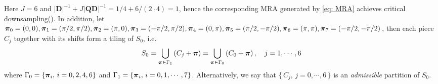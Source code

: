 Here $J= 6$ and $ |\mathbf{D}|^{-1} + J|\mathbf{QD}|^{-1} = 1/4 + 6/ (2\cdot 4) = 1$, hence the corresponding MRA generated by \eqref{eq: MRA} achieves critical downsampling(\cite{durand2007}). 
In addition, let {\small $\boldsymbol{\pi}_0 = (0,0), \boldsymbol{\pi}_1 = (\pi/2,\pi/2), \boldsymbol{\pi}_2 = (\pi,0),\boldsymbol{\pi}_3 = (-\pi/2,\pi/2), \boldsymbol{\pi}_4 = (0,\pi), \boldsymbol{\pi}_5 = (\pi/2,-\pi/2),\boldsymbol{\pi}_6 = (\pi,\pi), \boldsymbol{\pi}_7=(-\pi/2,-\pi/2)$}, then each piece $C_j$ together with its shifts form a tiling of $S_0$, i.e.
\begin{align}\label{eq: tiling}
S_0 = \bigcup_{\boldsymbol{\pi}\in\Gamma_1}\left(C_j + \boldsymbol{\pi}\right) = \bigcup_{\boldsymbol{\pi}\in\Gamma_0}\left(C_0 + \boldsymbol{\pi}\right),\quad j = 1,\cdots,6
\end{align}
where
$\Gamma_0= \{\boldsymbol{\pi}_i,\, i = 0,2,4,6\}$ and 
$\Gamma_1 = \{\boldsymbol{\pi}_i,\, i = 0,1,\cdots,7\}$.
Alternatively, we say that $\{\,C_j,\, j = 0,\cdots,6\,\}$ is an {\it admissible} partition of $S_0$.
